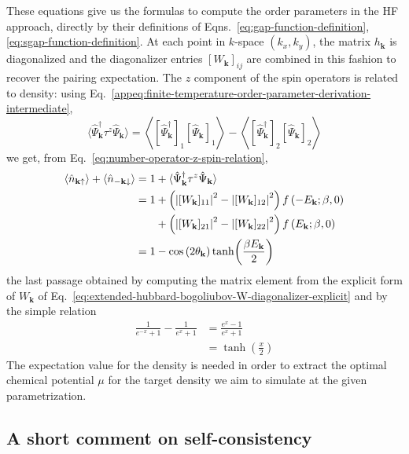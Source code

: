 These equations give us the formulas to compute the order parameters in the HF approach, directly by their definitions of Eqns.~\eqref{eq:gap-function-definition}, \eqref{eq:sgap-function-definition}. At each point in $k$-space $(k_x,k_y)$, the matrix $h_\mathbf{k}$ is diagonalized and the diagonalizer entries $[W_\mathbf{k}]_{ij}$ are combined in this fashion to recover the pairing expectation. The $z$ component of the spin operators is related to density: using Eq.~\eqref{appeq:finite-temperature-order-parameter-derivation-intermediate},
\[
	\langle \hat\Psi_\mathbf{k}^\dagger \tau^z \hat\Psi_\mathbf{k} \rangle = \left\langle [\hat \Psi_\mathbf{k}^\dagger]_1 [\hat \Psi_\mathbf{k}]_1 \right\rangle - \left\langle [\hat \Psi_\mathbf{k}^\dagger]_2 [\hat \Psi_\mathbf{k}]_2 \right\rangle
\]
we get, from Eq.~\eqref{eq:number-operator-z-spin-relation},
\begin{align}
	\langle \hat n_{\mathbf{k}\uparrow} \rangle + \langle \hat 	n_{-\mathbf{k}\downarrow} \rangle = 1 &+ \langle \hat\Psi_\mathbf{k}^\dagger \tau^z \hat\Psi_\mathbf{k} \rangle \nonumber \\
	= 1 &+ \left(
		\abs{[W_\mathbf{k}]_{11}}^2 - \abs{[W_\mathbf{k}]_{12}}^2
	\right) f\left( -E_\mathbf{k}; \beta,0 \right) \nonumber \\
	&+ \left(
		\abs{[W_\mathbf{k}]_{21}}^2 - \abs{[W_\mathbf{k}]_{22}}^2
	\right) f\left( E_\mathbf{k}; \beta,0 \right) \nonumber \\
	= 1 &- \cos \left(2 \theta_\mathbf{k}\right) \tanh(\frac{\beta E_\mathbf{k}}{2}) \label{eq:density-expectation} 
\end{align}
the last passage obtained by computing the matrix element from the explicit form of $W_\mathbf{k}$ of Eq.~\eqref{eq:extended-hubbard-bogoliubov-W-diagonalizer-explicit} and by the simple relation
\[
\begin{aligned}
	\frac{1}{e^{-x}+1} - \frac{1}{e^x+1} &= \frac{e^x -1}{e^x +1} \\
	&= \tanh(\frac{x}{2})
\end{aligned}
\]
The expectation value for the density is needed in order to extract the optimal chemical potential $\mu$ for the target density we aim to simulate at the given parametrization.

\subsection{A short comment on self-consistency}\label{subsec:mft-self-consitency-cooper-decomposition}


